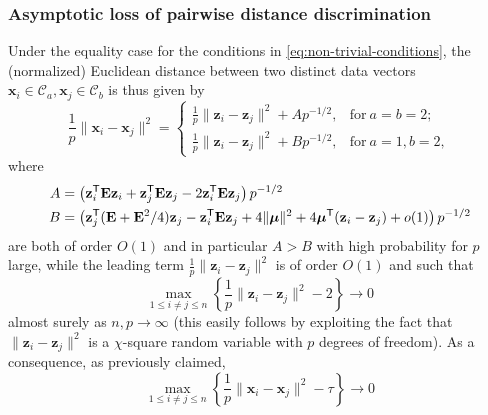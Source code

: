 \documentclass[MAL,biber]{nowfnt} %
\newcommand{\T}{{\sf T}}
\newcommand{\E}{{\mathbf{E}}}
\newcommand{\x}{{\mathbf{x}}}
\newcommand{\z}{{\mathbf{z}}}
\newcommand{\bmu}{{ \boldsymbol{\mu} }}
\begin{document}
\subsubsection{Asymptotic loss of pairwise distance discrimination}

Under the equality case for the conditions in \eqref{eq:non-trivial-conditions}, the (normalized) Euclidean distance between two distinct data vectors $\x_i \in \mathcal{C}_a, \x_j \in \mathcal{C}_b$ is thus given by
\begin{equation}\label{eq:distance-constant-concrete}
    \frac1p \| \x_i - \x_j \|^2 = \begin{cases} \frac1p \| \z_i - \z_j\|^2 + A p^{-1/2},  & \text{for} \ a=b=2; \\ \frac1p \| \z_i - \z_j\|^2 + B p^{-1/2}, & \text{for} \ a=1, b=2, \end{cases}
\end{equation}
where
\begin{align*}
    A & = \left( \z_i^\T \E  \z_i + \z_j^\T \E  \z_j - 2 \z_i^\T \E \z_j \right) p^{-1/2} \\
    B &= \left( \z_j^\T ( \E + \E^2/4 ) \z_j - \z_i^\T \E \z_j + 4 \| \bmu \|^2 + 4 \bmu^\T (\z_i - \z_j) + o(1) \right) p^{-1/2}
\end{align*}
are both of order $O(1)$ and in particular $A > B$ with high probability for $p$ large, while the leading term $\frac1p \| \z_i - \z_j \|^2$ is of order $O(1)$ and such that
\begin{equation*}
    \max_{1\le i \neq j \le n} \left\{ \frac1p \| \z_i - \z_j \|^2 - 2 \right\} \to 0
\end{equation*}
almost surely as $n,p \to \infty$ (this easily follows by exploiting the fact that $\| \z_i - \z_j \|^2$ is a $\chi$-square random variable with $p$ degrees of freedom). As a consequence, as previously claimed,
\begin{equation*}
    \max_{1\le i \neq j \le n} \left\{ \frac1p \| \x_i - \x_j \|^2 - \tau \right\} \to 0
\end{equation*}
\end{document}
